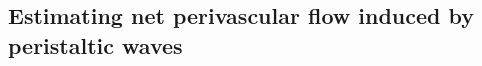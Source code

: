 



\subsection{Estimating net perivascular flow induced by peristaltic waves}
\label{sec:app:peristalsis}

